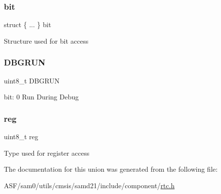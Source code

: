 \subsubsection{\texorpdfstring{bit}{bit}}
{\footnotesize\ttfamily struct \{ ... \}   bit}

Structure used for bit access \mbox{\label{union_r_t_c___d_b_g_c_t_r_l___type_a1e1cc79f6834369b9dd0c6676a0d8781}} 
\subsubsection{\texorpdfstring{DBGRUN}{DBGRUN}}
{\footnotesize\ttfamily uint8\+\_\+t D\+B\+G\+R\+UN}

bit\+: 0 Run During Debug \mbox{\label{union_r_t_c___d_b_g_c_t_r_l___type_a9428adc9af4653a2050e2536b55dec8d}} 
\subsubsection{\texorpdfstring{reg}{reg}}
{\footnotesize\ttfamily uint8\+\_\+t reg}

Type used for register access 

The documentation for this union was generated from the following file\+:\begin{DoxyCompactItemize}
\item 
A\+S\+F/sam0/utils/cmsis/samd21/include/component/\mbox{\hyperlink{component_2rtc_8h}{rtc.\+h}}\end{DoxyCompactItemize}
